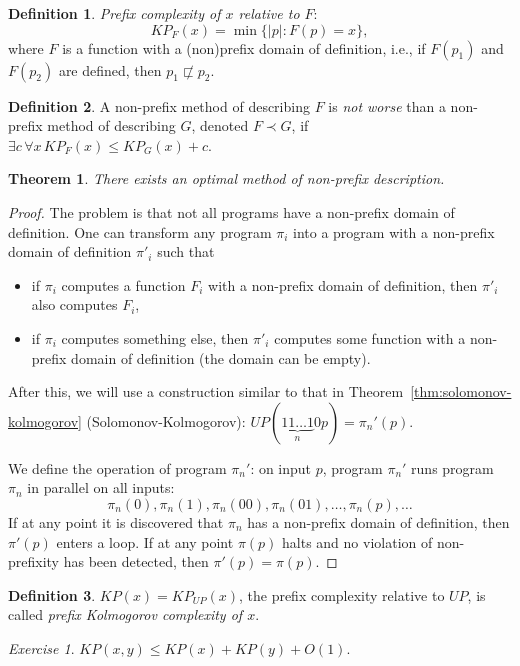 \documentclass[12pt,sans]{article}
\theoremstyle{definition}
\newtheorem{definition}{Definition}[section]
\theoremstyle{plain}
\newtheorem{theorem}{Theorem}[section]
\theoremstyle{remark}
\newtheorem{exercise}{Exercise}[section]
\begin{document}
\begin{definition}
    \emph{Prefix complexity of $x$ relative to $F$}:
    \[
    KP_F(x) = \min \{|p| : F(p) = x\},
    \]
    where $F$ is a function with a (non)prefix domain of definition, i.e., if $F(p_1)$ and $F(p_2)$ are defined, then $p_1 \not\sqsubset p_2$.
\end{definition}
\begin{definition}
    A non-prefix method of describing $F$ is \emph{not worse} than a non-prefix method of describing $G$, denoted $F \prec G$, if $\exists c \, \forall x \, KP_F(x) \le KP_G(x) + c$.
\end{definition}
\begin{theorem}
    There exists an optimal method of non-prefix description.
\end{theorem}
\begin{proof}
    The problem is that not all programs have a non-prefix domain of definition. One can transform any program $\pi_i$ into a program with a non-prefix domain of definition $\pi'_i$ such that
    \begin{itemize}
        \item if $\pi_i$ computes a function $F_i$ with a non-prefix domain of definition, then $\pi'_i$ also computes $F_i$,
        \item if $\pi_i$ computes something else, then $\pi'_i$ computes some function with a non-prefix domain of definition (the domain can be empty).
    \end{itemize}
    After this, we will use a construction similar to that in Theorem~\ref{thm:solomonov-kolmogorov} (Solomonov-Kolmogorov):
    $UP(\underbrace{11\dotso 1}_n 0p) = \pi_n'(p)$.

    We define the operation of program $\pi_n'$: on input $p$, program $\pi_n'$ runs program $\pi_n$ in parallel on all inputs:
    \[\pi_n(0), \pi_n(1), \pi_n(00), \pi_n(01), \dotsc, \pi_n(p), \dotsc\]
    If at any point it is discovered that $\pi_n$ has a non-prefix domain of definition, then $\pi'(p)$ enters a loop. If at any point $\pi(p)$ halts and no violation of non-prefixity has been detected, then $\pi'(p) = \pi(p)$.
\end{proof}
\begin{definition}
    $KP(x) = KP_{UP}(x)$, the prefix complexity relative to $UP$, is called \emph{prefix Kolmogorov complexity of $x$}.
\end{definition}
\begin{exercise}
    $KP(x,y) \le KP(x) + KP(y) + O(1)$.
\end{exercise}
\end{document}
